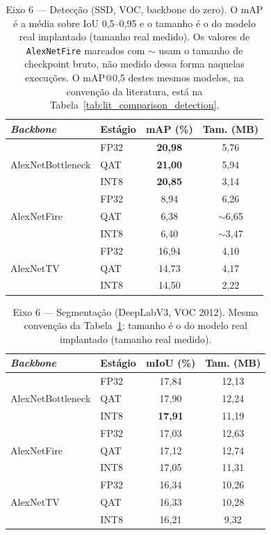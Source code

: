 \documentclass[conference]{IEEEtran}
\begin{document}
\begin{table}[!t]
\caption{Eixo 6 — Detecção (SSD, VOC, backbone do zero). O mAP é a média sobre IoU 0,5--0,95 e o
tamanho é o do modelo real implantado (tamanho real medido). Os valores de
\texttt{AlexNetFire} marcados com $\sim$ usam o tamanho de checkpoint bruto, não medido dessa
forma naquelas execuções. O mAP@0,5 destes mesmos modelos, na convenção da
literatura, está na Tabela~\ref{tab:lit_comparison_detection}.}
\label{tab:phase_7_detection}
\centering
\small
\begin{tabular}{@{}llcc@{}}
\toprule
\textbf{\textit{Backbone}} & \textbf{Estágio} & \textbf{mAP (\%)} & \textbf{Tam. (MB)} \\
\midrule
\multirow{3}{*}{AlexNetBottleneck} & FP32 & \textbf{20,98} & 5,76 \\
 & QAT & \textbf{21,00} & 5,94 \\
 & INT8 & \textbf{20,85} & 3,14 \\
\midrule
\multirow{3}{*}{AlexNetFire} & FP32 & 8,94 & 6,26 \\
 & QAT & 6,38 & $\sim$6,65 \\
 & INT8 & 6,40 & $\sim$3,47 \\
\midrule
\multirow{3}{*}{AlexNetTV} & FP32 & 16,94 & 4,10 \\
 & QAT & 14,73 & 4,17 \\
 & INT8 & 14,50 & 2,22 \\
\bottomrule
\end{tabular}
\end{table}

\begin{table}[!t]
\caption{Eixo 6 — Segmentação (DeepLabV3, VOC 2012). Mesma convenção da
Tabela~\ref{tab:phase_7_detection}: tamanho é o do modelo real implantado
(tamanho real medido).}
\label{tab:phase_7_segmentation}
\centering
\small
\begin{tabular}{@{}llcc@{}}
\toprule
\textbf{\textit{Backbone}} & \textbf{Estágio} & \textbf{mIoU (\%)} & \textbf{Tam. (MB)} \\
\midrule
\multirow{3}{*}{AlexNetBottleneck} & FP32 & 17,84 & 12,13 \\
 & QAT & 17,90 & 12,24 \\
 & INT8 & \textbf{17,91} & 11,19 \\
\midrule
\multirow{3}{*}{AlexNetFire} & FP32 & 17,03 & 12,63 \\
 & QAT & 17,12 & 12,74 \\
 & INT8 & 17,05 & 11,31 \\
\midrule
\multirow{3}{*}{AlexNetTV} & FP32 & 16,34 & 10,26 \\
 & QAT & 16,33 & 10,28 \\
 & INT8 & 16,21 & 9,32 \\
\bottomrule
\end{tabular}
\end{table}
\end{document}
